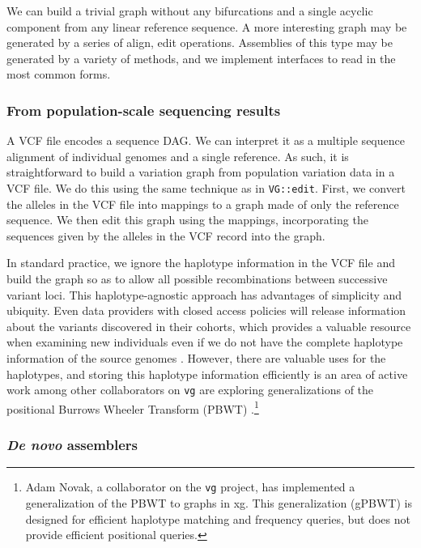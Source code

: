 \documentclass{article}
\begin{document}
We can build a trivial graph without any bifurcations and a single acyclic component from any linear reference sequence.
A more interesting graph may be generated by a series of align, edit operations.
Assemblies of this type may be generated by a variety of methods, and we implement interfaces to read in the most common forms.

\subsubsection{From population-scale sequencing results}

A VCF file encodes a sequence DAG.
We can interpret it as a multiple sequence alignment of individual genomes and a single reference.
As such, it is straightforward to build a variation graph from population variation data in a VCF file.
We do this using the same technique as in {\tt VG::edit}.
First, we convert the alleles in the VCF file into mappings to a graph made of only the reference sequence. 
We then edit this graph using the mappings, incorporating the sequences given by the alleles in the VCF record into the graph. 

In standard practice, we ignore the haplotype information in the VCF file and build the graph so as to allow all possible recombinations between successive variant loci.
This haplotype-agnostic approach has advantages of simplicity and ubiquity.
Even data providers with closed access policies will release information about the variants discovered in their cohorts, which provides a valuable resource when examining new individuals even if we do not have the complete haplotype information of the source genomes \cite{exac2015}.
However, there are valuable uses for the haplotypes, and storing this haplotype information efficiently is an area of active work among other collaborators on {\tt vg} are exploring generalizations of the positional Burrows Wheeler Transform (PBWT) \cite{durbin2014}.\footnote{Adam Novak, a collaborator on the {\tt vg} project, has implemented a generalization of the PBWT to graphs in xg. This generalization (gPBWT) is designed for efficient haplotype matching and frequency queries, but does not provide efficient positional queries.}

\subsubsection{\emph{De novo} assemblers}
\end{document}
